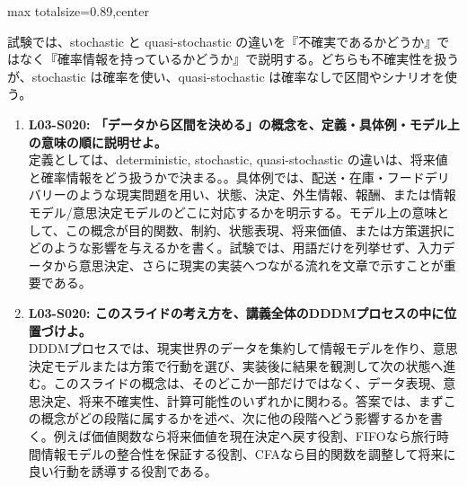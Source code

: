 \begin{minipage}[t]{0.58\textwidth}
\begin{adjustbox}{max totalsize={\textwidth}{0.89\textheight},center}
\begin{minipage}{\textwidth}
試験では、stochastic と quasi-stochastic の違いを『不確実であるかどうか』ではなく『確率情報を持っているかどうか』で説明する。どちらも不確実性を扱うが、stochastic は確率を使い、quasi-stochastic は確率なしで区間やシナリオを使う。\par{}\begin{enumerate}\item \textbf{L03-S020: 「データから区間を決める」の概念を、定義・具体例・モデル上の意味の順に説明せよ。}\\定義としては、deterministic, stochastic, quasi-stochastic の違いは、将来値と確率情報をどう扱うかで決まる。。具体例では、配送・在庫・フードデリバリーのような現実問題を用い、状態、決定、外生情報、報酬、または情報モデル/意思決定モデルのどこに対応するかを明示する。モデル上の意味として、この概念が目的関数、制約、状態表現、将来価値、または方策選択にどのような影響を与えるかを書く。試験では、用語だけを列挙せず、入力データから意思決定、さらに現実の実装へつながる流れを文章で示すことが重要である。\item \textbf{L03-S020: このスライドの考え方を、講義全体のDDDMプロセスの中に位置づけよ。}\\DDDMプロセスでは、現実世界のデータを集約して情報モデルを作り、意思決定モデルまたは方策で行動を選び、実装後に結果を観測して次の状態へ進む。このスライドの概念は、そのどこか一部だけではなく、データ表現、意思決定、将来不確実性、計算可能性のいずれかに関わる。答案では、まずこの概念がどの段階に属するかを述べ、次に他の段階へどう影響するかを書く。例えば価値関数なら将来価値を現在決定へ戻す役割、FIFOなら旅行時間情報モデルの整合性を保証する役割、CFAなら目的関数を調整して将来に良い行動を誘導する役割である。\end{enumerate}
\end{minipage}
\end{adjustbox}
\end{minipage}


